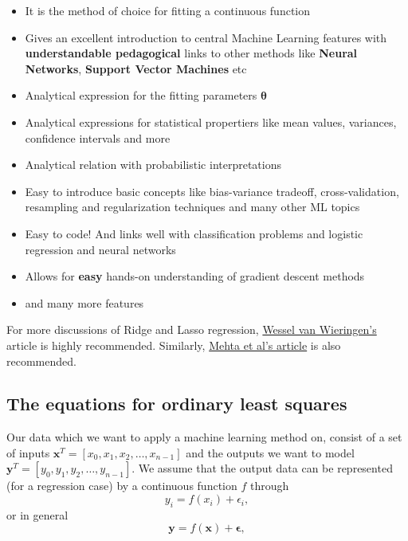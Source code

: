 \documentclass[%
oneside,                 %
final,                   %
10pt]{article}
\begin{document}
\begin{itemize}
\item It is the method of choice for fitting a continuous function

\item Gives an excellent introduction to central Machine Learning features with \textbf{understandable pedagogical} links to other methods like \textbf{Neural Networks}, \textbf{Support Vector Machines} etc

\item Analytical expression for the fitting parameters $\bm{\theta}$

\item Analytical expressions for statistical propertiers like mean values, variances, confidence intervals and more

\item Analytical relation with probabilistic interpretations 

\item Easy to introduce basic concepts like bias-variance tradeoff, cross-validation, resampling and regularization techniques and many other ML topics

\item Easy to code! And links well with classification problems and logistic regression and neural networks

\item Allows for \textbf{easy} hands-on understanding of gradient descent methods

\item and many more features
\end{itemize}

\noindent
For more discussions of Ridge and Lasso regression, \href{{https://arxiv.org/abs/1509.09169}}{Wessel van Wieringen's} article is highly recommended.
Similarly, \href{{https://arxiv.org/abs/1803.08823}}{Mehta et al's article} is also recommended.

\subsection{The equations for ordinary least squares}

Our data which we want to apply a machine learning method on, consist
of a set of inputs $\bm{x}^T=[x_0,x_1,x_2,\dots,x_{n-1}]$ and the
outputs we want to model $\bm{y}^T=[y_0,y_1,y_2,\dots,y_{n-1}]$.
We assume  that the output data can be represented (for a regression case) by a continuous function $f$
through
\[
y_i=f(x_i)+\epsilon_i,
\]
or in general
\[
\bm{y}=f(\bm{x})+\bm{\epsilon},
\]
\end{document}

